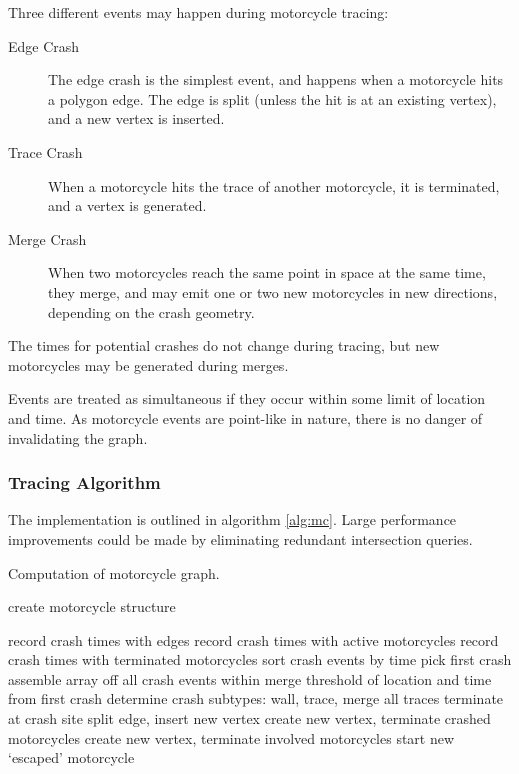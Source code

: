 \documentclass[12pt,a4paper,oneside,openany]{article}
\begin{document}
Three different events may happen during motorcycle tracing:
\begin{description}
\item[Edge Crash] The edge crash is the simplest event, and happens when a motorcycle hits a polygon edge. The edge is split (unless the hit is at an existing vertex), and a new vertex is inserted.
\item[Trace Crash] When a motorcycle hits the trace of another motorcycle, it is terminated, and a vertex is generated.
\item[Merge Crash] When two motorcycles reach the same point in space at the same time, they merge, and may emit one or two new motorcycles in new directions, depending on the crash geometry.
\end{description}

The times for potential crashes do not change during tracing, but new motorcycles may be generated during merges.

Events are treated as simultaneous if they occur within some limit of location and time. As motorcycle events are point-like in nature, there is no danger of invalidating the graph.


\subsubsection{Tracing Algorithm}

The implementation is outlined in algorithm \ref{alg:mc}. Large performance improvements could be made by eliminating redundant intersection queries.

\begin{algorithm}
\caption{Computation of motorcycle graph.}
\label{alg:mc}
\begin{algorithmic}
	\State create motorcycle structure
\EndFor

\Repeat
		\State record crash times with edges
		\State record crash times with active motorcycles
		\State record crash times with terminated motorcycles
	\EndFor
	\State sort crash events by time
	\State pick first crash
	\State assemble array off all crash events within merge threshold of location and time from first crash
	\State determine crash subtypes: wall, trace, merge
		\State all traces terminate at crash site
			\State split edge, insert new vertex
		\EndIf
		\State create new vertex, terminate crashed motorcycles
	\Else
		\State create new vertex, terminate involved motorcycles
			\State start new `escaped' motorcycle
		\EndIf
	\EndIf 

\end{algorithmic}
\end{algorithm}
\end{document}
